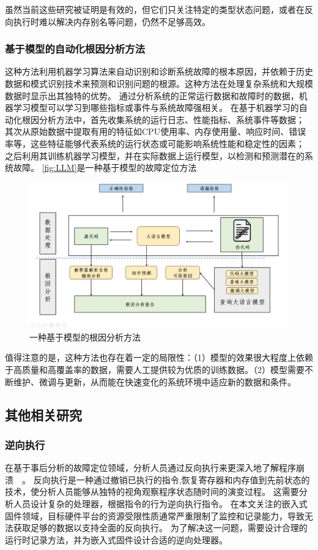 虽然当前这些研究被证明是有效的，但它们只关注特定的类型状态问题，或者在反向执行时难以解决内存别名等问题，仍然不足够高效。
\subsubsection{基于模型的自动化根因分析方法}
这种方法利用机器学习算法来自动识别和诊断系统故障的根本原因，并依赖于历史数据和模式识别技术来预测和识别问题的根源。这种方法在处理复杂系统和大规模数据时显示出其独特的优势。
通过分析系统的正常运行数据和故障时的数据，机器学习模型可以学习到哪些指标或事件与系统故障强相关。
在基于机器学习的自动化根因分析方法中，首先收集系统的运行日志、性能指标、系统事件等数据；
其次从原始数据中提取有用的特征如CPU使用率、内存使用量、响应时间、错误率等，这些特征能够代表系统的运行状态或可能影响系统性能和稳定性的因素；
之后利用其训练机器学习模型，并在实际数据上运行模型，以检测和预测潜在的系统故障。
\autoref{fig:LLM}是一种基于模型的故障定位方法~\cite{How2024}
\begin{figure}[h]
    \centering
    \includegraphics[width=1.0\textwidth]{./figure/LLM.png}
    \caption{一种基于模型的根因分析方法}
    \label{fig:LLM}
\end{figure}

值得注意的是，这种方法也存在着一定的局限性：（1）模型的效果很大程度上依赖于高质量和高覆盖率的数据，需要人工提供较为优质的训练数据。（2）模型需要不断维护、微调与更新，从而能在快速变化的系统环境中适应新的数据和条件。


\subsection{其他相关研究}
\subsubsection{逆向执行}
在基于事后分析的故障定位领域，分析人员通过反向执行来更深入地了解程序崩溃~\cite{RETracer2016}~\cite{REPT}。
反向执行是一种通过撤销已执行的指令,恢复寄存器和内存值到先前状态的技术，使分析人员能够从独特的视角观察程序状态随时间的演变过程。
这需要分析人员设计复杂的处理器，根据指令的行为逆向执行指令。
在本文关注的嵌入式固件领域，目标硬件平台的资源受限性质通常严重限制了监控和记录能力，导致无法获取足够的数据以支持全面的反向执行。
为了解决这一问题，需要设计合理的运行时记录方法，并为嵌入式固件设计合适的逆向处理器。

